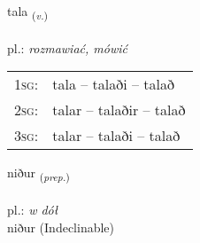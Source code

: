 \documentclass[frontgrid, backgrid]{flacards}\usepackage[]{graphicx}\usepackage[]{xcolor}
\begin{document}
{tala \small{\textsubscript{(\textit{v.})}} \\[1ex] %
\textphonetic{[tʰaːla]} \\
pl.: \emph{rozmawiać, mówić} \\  [2ex]
\renewcommand*{\arraystretch}{0.8}
\begin{tabular}{p{1cm}l}
\textsc{1sg}: & tala -- talaði -- talað \\ 
\textsc{2sg}: & talar -- talaðir -- talað \\ 
\textsc{3sg}: & talar -- talaði -- talað \\ 
\end{tabular}
}


\renewcommand{\flhead}{\vskip5pt \fboxsep=0pt {\small\bfseries\footnotesize Forsetning | przyimek}}
\renewcommand{\fcfoot}{\vskip5pt \fboxsep=0pt \hspace{2pt}{\small\bfseries\footnotesize 1K}}

\renewcommand{\blhead}{\vskip5pt {\small\bfseries\footnotesize Forsetning | przyimek }}
\renewcommand{\bcfoot}{\vskip5pt \hspace{2pt}{\small\bfseries\footnotesize 1K}}


{niður \small{\textsubscript{(\textit{prep.})}} \\[1ex]
\textphonetic{[nɪːðʏr]} \\
pl.: \emph{w dół} \\  [2ex]
niður (Indeclinable)}


\renewcommand{\flhead}{\vskip5pt \fboxsep=0pt {\small\bfseries\footnotesize Atviksorð | przysłówek}}
\renewcommand{\fcfoot}{\vskip5pt \fboxsep=0pt \hspace{2pt}{\small\bfseries\footnotesize 1K}}

\renewcommand{\blhead}{\vskip5pt {\small\bfseries\footnotesize Atviksorð | przysłówek }}
\renewcommand{\bcfoot}{\vskip5pt \hspace{2pt}{\small\bfseries\footnotesize 1K}}
\end{document}

